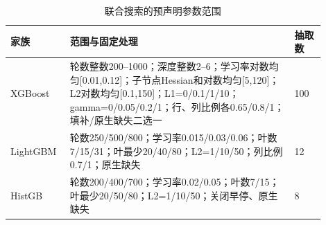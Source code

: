 \begin{table}[htbp]
\small
\setlength{\tabcolsep}{5pt}
\centering
\caption{联合搜索的预声明参数范围}
\label{tab:joint-search}
\begin{tabular}{L{0.15\linewidth}L{0.66\linewidth}L{0.09\linewidth}}
\toprule
家族 & 范围与固定处理 & 抽取数 \\
\midrule
XGBoost & 轮数整数200--1000；深度整数2--6；学习率对数均匀[0.01,0.12]；子节点Hessian和对数均匀[5,120]；L2对数均匀[0.1,150]；L1=0/0.1/1/10；gamma=0/0.05/0.2/1；行、列比例各0.65/0.8/1；填补/原生缺失二选一 & 100 \\
LightGBM & 轮数250/500/800；学习率0.015/0.03/0.06；叶数7/15/31；叶最少20/40/80；L2=1/10/50；列比例0.7/1；原生缺失 & 12 \\
HistGB & 轮数200/400/700；学习率0.02/0.05；叶数7/15；叶最少20/50/80；L2=1/10/50；关闭早停、原生缺失 & 8 \\
\bottomrule
\end{tabular}
\end{table}
